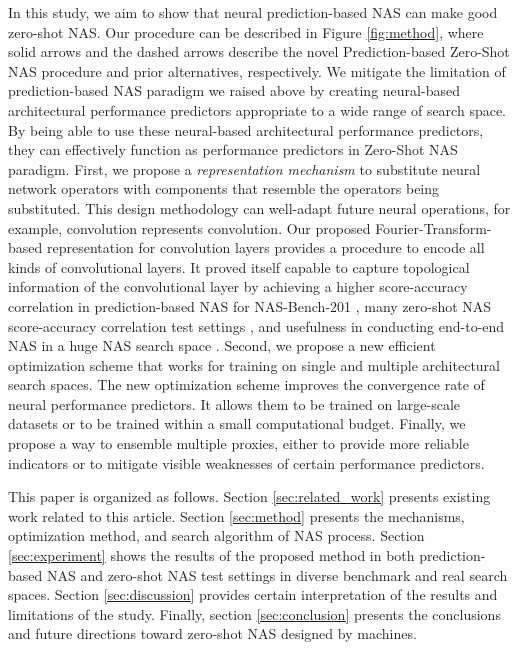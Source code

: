 \documentclass[lettersize,journal]{IEEEtran}
\begin{document}
In this study, we aim to show that neural prediction-based NAS can make good zero-shot NAS. Our procedure can be described in Figure \ref{fig:method}, where solid arrows and the dashed arrows describe the novel Prediction-based Zero-Shot NAS procedure and prior alternatives, respectively. We mitigate the limitation of prediction-based NAS paradigm we raised above by creating neural-based architectural performance predictors appropriate to a wide range of search space. By being able to use these neural-based architectural performance predictors, they can effectively function as performance predictors in Zero-Shot NAS paradigm. First, we propose a \emph{representation mechanism} to substitute neural network operators with components that resemble the operators being substituted. This design methodology can well-adapt future neural operations, for example, convolution represents convolution. Our proposed Fourier-Transform-based representation for convolution layers provides a procedure to encode all kinds of convolutional layers. It proved itself capable to capture topological information of the convolutional layer by achieving a higher score-accuracy correlation in prediction-based NAS for NAS-Bench-201 \cite{nb201}, many zero-shot NAS score-accuracy correlation test settings \cite{nds, nb201, nb101, macro}, and usefulness in conducting end-to-end NAS in a huge NAS search space \cite{Zen-NAS}. Second, we propose a new efficient optimization scheme that works for training on single and multiple architectural search spaces. The new optimization scheme improves the convergence rate of neural performance predictors. It allows them to be trained on large-scale datasets or to be trained within a small computational budget. Finally, we propose a way to ensemble multiple proxies, either to provide more reliable indicators or to mitigate visible weaknesses of certain performance predictors.


This paper is organized as follows. Section \ref{sec:related_work} presents existing work related to this article. Section \ref{sec:method} presents the mechanisms, optimization method, and search algorithm of NAS process. Section \ref{sec:experiment} shows the results of the proposed method in both prediction-based NAS and zero-shot NAS test settings in diverse benchmark and real search spaces. Section \ref{sec:discussion} provides certain interpretation of the results and limitations of the study. Finally, section \ref{sec:conclusion} presents the conclusions and future directions toward zero-shot NAS designed by machines.
\end{document}
